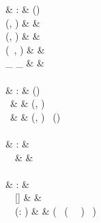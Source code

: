 \begin{figure}[H]
\begin{functioncode}{
\textcode{(\#)}                                                 &   :           & (\Outcome \times \Type) \rightarrow \Val \rightarrow \Booldomain \\
(\onormal, \Voidtype) \mathrel{\#} \vundef                            &   \triangleq  & \true \\
(\oreturn, \Voidtype) \mathrel{\#} \vundef                            &   \triangleq  & \true \\
(\oreturn \ \Valvar, \tau) \mathrel{\#} \Valvar                        &   \triangleq  & \pseudoif \tau \neq \Voidtype \ \pseudothen \true \ \pseudoelse \false \\
\_ \mathrel{\#} \_                                                    &   \triangleq  & \false \\~\\

                                                &   :           & \Scopemap \rightarrow (\Scopemap \times \Scopeid) \\
 \ \emptyset                                    &   \triangleq  & (, )  \\
 \ \Scopemapvar                                 &   \triangleq  & (\Scopemapvar\set{\Scopeidvar \leftarrow \true}, \Scopeidvar) \ \pseudowhere \Scopeidvar \not\in {}(\Scopemapvar) \\~\\

                                           &   :           &   \Mem \to \Block \to \Mem \\
 \ \Memvar \ \Blockvar                     &   \triangleq  &   \Memvar\set{\Blockvar \leftarrow \Memvar(\Blockvar) \pseudowith [\Memblockmemberhi := 0]}\\~\\

                                         &   :           &   \Mem \to \List{\Block} \to \Mem \\
 \ \Memvar \ []                          &   \triangleq  &   \Memvar \\
 \ \Memvar \ (\Blockvar : )  &   \triangleq  &   ( \ ( \ \Memvar \ \Blockvar) \ ) \\~\\

}
\end{functioncode}
\end{figure}
